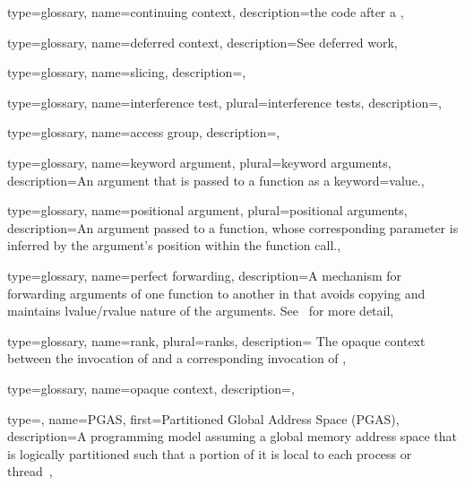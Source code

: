 {
  type=glossary,
  name={continuing context},
  description={the code after a },
}

{
  type=glossary,
  name={deferred context},
  description={See \gls{deferred work}},
}

{
  type={glossary},
  name={slicing},
  description={},
}

{
  type={glossary},
  name={interference test},
  plural={interference tests},
  description={},
}


{
  type={glossary},
  name={access group},
  description={},
}

{
  type={glossary},
  name={keyword argument},
  plural={keyword arguments},
  description={An argument that is passed to a function as a keyword=value.},
}

{
  type={glossary},
  name={positional argument},
  plural={positional arguments},
  description={An argument passed to a function, whose corresponding parameter
    is inferred by the argument's position within the function call.},
}

{
  type={glossary},
  name={perfect forwarding},
  description={A mechanism for forwarding arguments of one function to another
    in \CC{} that avoids copying and maintains lvalue/rvalue nature of the
      arguments. See~\cite{perfect-forwarding} for more detail},
}

{
  type=glossary,
  name=rank,
  plural=ranks,
  description={ The \gls{opaque context} between the invocation of
     and a corresponding invocation of },
}

{
  type=glossary,
  name={opaque context},
  description={},
}


{
  type=\acronymtype,
  name={PGAS},
  first={Partitioned Global Address Space (PGAS)},
  description={A programming model assuming a global memory address space that is logically
    partitioned such that a portion of it is local to each process or thread~\cite{PGAS}},
}


